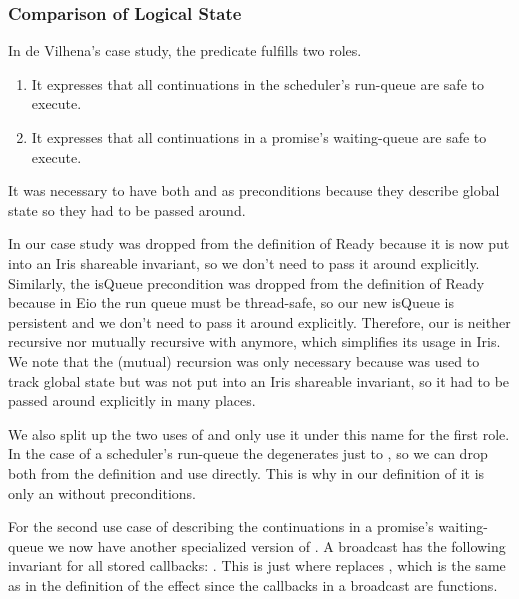 \subsubsection{Comparison of Logical State}
\label{sec:sched-spec-state-comparison}


In de Vilhena's case study, the \gsReady{} predicate fulfills two roles.
\begin{enumerate}
  \item It expresses that all continuations in the scheduler's run-queue are safe to execute.
  \item It expresses that all continuations in a promise's waiting-queue are safe to execute.
\end{enumerate}

It was necessary to have both \gsPInv{} and \gsIsQueue{} as preconditions because they describe global state so they had to be passed around.

In our case study \gsPInv{} was dropped from the definition of Ready because it is now put into an Iris shareable invariant, so we don't need to pass it around explicitly.
Similarly, the isQueue precondition was dropped from the definition of Ready because in Eio the run queue must be thread-safe, so our new isQueue is persistent and we don't need to pass it around explicitly.
Therefore, our \gsReady{} is neither recursive nor mutually recursive with \gsPInv{} anymore, which simplifies its usage in Iris.
We note that the (mutual) recursion was only necessary because \gsPInv{} was used to track global state but was not put into an Iris shareable invariant, so it had to be passed around explicitly in many places.

We also split up the two uses of \gsReady{} and only use it under this name for the first role.
In the case of a scheduler's run-queue the  degenerates just to , so we can drop both from the definition and use \ocamlin{()} directly.
This is why in our definition of \gsReady{} it is only an \ewpt{} without preconditions.

For the second use case of describing the continuations in a promise's waiting-queue we now have another specialized version of \gsReady{}.
A broadcast has the following invariant for all stored callbacks: .
This is just \gsReady{} where  replaces , which is the same  as in the definition of the \esuspend{} effect since the callbacks in a broadcast are  functions.

